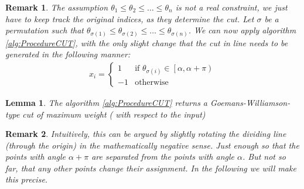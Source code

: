 \documentclass[12pt,a4paper]{article}
\theoremstyle{mythm}
\newtheorem{lem}[thm]{Lemma}
\newtheorem*{rem}{Remark}
\begin{document}
\begin{rem}
The assumption $ \theta_1 \leq \theta_2 \leq \dots \leq \theta_n  $ is not a real constraint, we just have to keep track the original indices, as they determine the cut.
Let $ \sigma $ be a permutation such that $ \theta _{ \sigma (1) } \leq \theta _{ \sigma (2) } \leq \dots \leq \theta _{ \sigma (n) }  $. 
We can now apply algorithm \ref{alg:ProcedureCUT}, with the only slight change that the cut in line  needs to be generated in the following manner:
\begin{align*}
x_i = \begin{cases}
1 & \text{if } \theta _{ \sigma (i) } \in \left[ \alpha, \alpha + \pi  \right)  \\
-1 & \text{otherwise} 
\end{cases}
\end{align*} 
\end{rem} 
\begin{lem}
\label{lem:algGeneratesAllgwtc} 
The algorithm \ref{alg:ProcedureCUT} returns a Goemans-Williamson-type cut of maximum weight ( with respect to the input) 
\end{lem} 
\begin{rem}
Intuitively, this can be argued by slightly rotating the dividing line (through the origin) in the mathematically negative sense. 
Just enough so that the points with angle $ \alpha + \pi  $ are separated from the points with angle $ \alpha $.
But not so far, that any other points change their assignment.
In the following we will make this precise.
\end{rem} 
\end{document}
